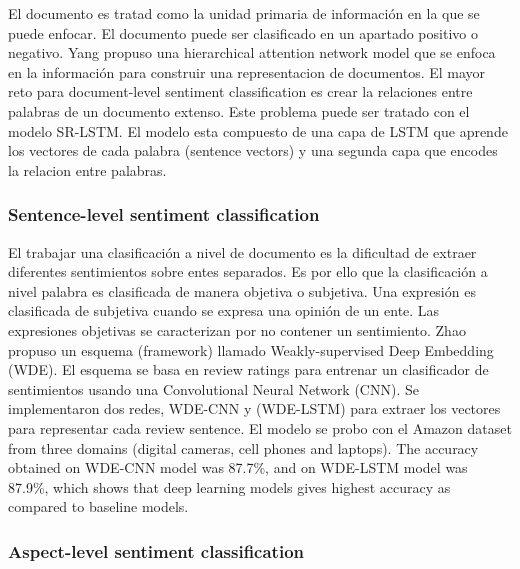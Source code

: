 El documento es tratad como la unidad primaria de información en la que se puede enfocar. El documento puede ser clasificado en un apartado positivo o negativo. Yang\cite{Yang_2016} propuso una hierarchical attention network model que se enfoca en la información para construir una representacion de documentos. El mayor reto para document-level sentiment classification es crear la relaciones entre palabras de un documento extenso. Este problema puede ser tratado con el modelo SR-LSTM\cite{Guozheng_2018}. El modelo esta compuesto de una capa de LSTM que aprende los vectores de cada palabra (sentence vectors) y una segunda capa que encodes la relacion entre palabras.

\subsubsection{Sentence-level sentiment classification}

El trabajar una clasificación a nivel de documento es la dificultad de extraer diferentes
sentimientos sobre entes separados. Es por ello que la clasificación a nivel palabra es clasificada de manera objetiva o subjetiva. Una expresión es clasificada de subjetiva cuando se expresa una opinión de un ente. Las expresiones objetivas se caracterizan por no contener un sentimiento. Zhao\cite{Zhao_2018_weakly} propuso un esquema (framework) llamado Weakly-supervised Deep Embedding (WDE). El esquema se basa en review ratings para entrenar un clasificador de sentimientos usando una Convolutional Neural Network (CNN). Se implementaron dos redes, WDE-CNN y (WDE-LSTM) para extraer los vectores para representar cada review sentence. El modelo se probo con el Amazon dataset from three domains (digital cameras, cell phones and laptops). The accuracy obtained on WDE-CNN model was
87.7\%, and on WDE-LSTM model was 87.9\%, which shows that deep learning models gives
highest accuracy as compared to baseline models.

\subsubsection{Aspect-level sentiment classification}


